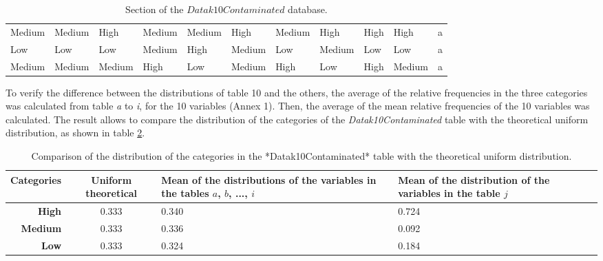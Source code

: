 \documentclass[mathematics,article,submit,moreauthors,pdftex]{mdpi}
\begin{document}
\begin{table}[!ht]
{\begin{tabular}{@{}lllllllllll@{}}
Medium                       & Medium                         & High                         & Medium                         & Medium                       & High                           & Medium                         & High                           & High                           & High                           & a \\
Low  & Low    & Low  & Medium & High & Medium & Low    & Medium & Low    & Low    & a                         \\
Medium                       & Medium                         & Medium                       & High                           & Low                          & Medium                         & High                           & Low                            & High                           & Medium                         & a \\ \bottomrule
\end{tabular}
}

\caption{Section of the $Datak10Contaminated$ database.}

\label{tab:tabladatos}

\end{table}

To verify the difference between the distributions of table 10 and the
others, the average of the relative frequencies in the three categories
was calculated from table \emph{a} to \emph{i}, for the 10 variables
(Annex 1). Then, the average of the mean relative frequencies of the 10
variables was calculated. The result allows to compare the distribution
of the categories of the \emph{Datak10Contaminated} table with the
theoretical uniform distribution, as shown in table
\ref{tab:tablapromfreq}.

\begin{table}[H]
\centering
\begin{tabular}{rcp{3cm}p{3cm}}
\hline
\toprule

\textbf{Categories} & \textbf{Uniform theoretical} & \textbf{Mean of the distributions of the variables in the tables $a$, $b$, ...,  $i$} & \textbf{Mean of the distribution of the variables in the table $j$} \\ \midrule
\textbf{High}       & 0.333            & 0.340                & 0.724            \\ 
\textbf{Medium}     & 0.333            & 0.336                & 0.092            \\ 
\textbf{Low}        & 0.333            & 0.324                & 0.184            \\ \midrule
\end{tabular}
\caption{Comparison of the distribution of the categories in the *Datak10Contaminated* table with the theoretical uniform distribution.}
\label{tab:tablapromfreq}
\end{table}
\end{document}
